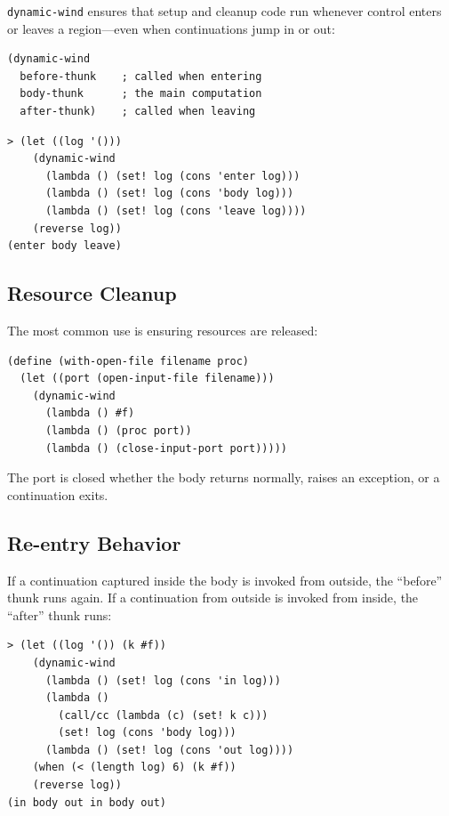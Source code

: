 \texttt{dynamic-wind} ensures that setup and cleanup code run whenever control enters or leaves a region---even when continuations jump in or out:

\begin{lstlisting}
(dynamic-wind
  before-thunk    ; called when entering
  body-thunk      ; the main computation
  after-thunk)    ; called when leaving
\end{lstlisting}

\begin{lstlisting}[style=repl]
> (let ((log '()))
    (dynamic-wind
      (lambda () (set! log (cons 'enter log)))
      (lambda () (set! log (cons 'body log)))
      (lambda () (set! log (cons 'leave log))))
    (reverse log))
(enter body leave)
\end{lstlisting}

\subsection{Resource Cleanup}

The most common use is ensuring resources are released:

\begin{lstlisting}
(define (with-open-file filename proc)
  (let ((port (open-input-file filename)))
    (dynamic-wind
      (lambda () #f)
      (lambda () (proc port))
      (lambda () (close-input-port port)))))
\end{lstlisting}

The port is closed whether the body returns normally, raises an exception, or a continuation exits.

\subsection{Re-entry Behavior}

If a continuation captured inside the body is invoked from outside, the ``before'' thunk runs again. If a continuation from outside is invoked from inside, the ``after'' thunk runs:

\begin{lstlisting}[style=repl]
> (let ((log '()) (k #f))
    (dynamic-wind
      (lambda () (set! log (cons 'in log)))
      (lambda ()
        (call/cc (lambda (c) (set! k c)))
        (set! log (cons 'body log)))
      (lambda () (set! log (cons 'out log))))
    (when (< (length log) 6) (k #f))
    (reverse log))
(in body out in body out)
\end{lstlisting}

